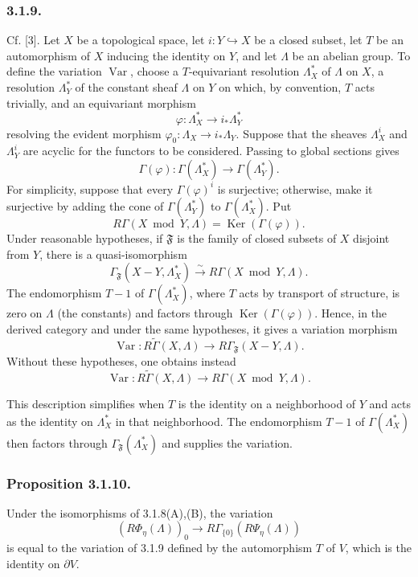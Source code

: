 \subsubsection*{3.1.9.}
Cf. [3].  Let $X$ be a topological space, let
$i:Y\hookrightarrow X$ be a closed subset, let $T$ be an
automorphism of $X$ inducing the identity on $Y$, and let $\Lambda$ be
an abelian group.  To define the variation $\operatorname{Var}$,
choose a $T$-equivariant resolution $\Lambda_X^*$ of $\Lambda$ on
$X$, a resolution $\Lambda_Y^*$ of the constant sheaf $\Lambda$ on
$Y$ on which, by convention, $T$ acts trivially, and an equivariant
morphism
\[
\varphi:\Lambda_X^*\longrightarrow i_*\Lambda_Y^*
\]
resolving the evident morphism
$\varphi_0:\Lambda_X\to i_*\Lambda_Y$.  Suppose that the sheaves
$\Lambda_X^i$ and $\Lambda_Y^i$ are acyclic for the functors to be
considered.  Passing to global sections gives
\[
\Gamma(\varphi):\Gamma(\Lambda_X^*)
\longrightarrow\Gamma(\Lambda_Y^*).
\]
For simplicity, suppose that every $\Gamma(\varphi)^i$ is surjective;
otherwise, make it surjective by adding the cone of
$\Gamma(\Lambda_Y^*)$ to $\Gamma(\Lambda_X^*)$.  Put
\[
R\Gamma(X\bmod Y,\Lambda)=\operatorname{Ker}(\Gamma(\varphi)).
\]
Under reasonable hypotheses, if $\mathfrak F$ is the family of closed
subsets of $X$ disjoint from $Y$, there is a quasi-isomorphism
\[
\Gamma_{\mathfrak F}(X-Y,\Lambda_X^*)
\xrightarrow{\ \sim\ }R\Gamma(X\bmod Y,\Lambda).
\]
The endomorphism $T-1$ of $\Gamma(\Lambda_X^*)$, where $T$ acts by
transport of structure, is zero on $\Lambda$ (the constants) and
factors through $\operatorname{Ker}(\Gamma(\varphi))$.  Hence, in the
derived category and under the same hypotheses, it gives a variation
morphism
\[
\operatorname{Var}:R\widetilde\Gamma(X,\Lambda)
\longrightarrow R\Gamma_{\mathfrak F}(X-Y,\Lambda).
\]
Without these hypotheses, one obtains instead
\[
\operatorname{Var}:R\widetilde\Gamma(X,\Lambda)
\longrightarrow R\Gamma(X\bmod Y,\Lambda).
\]

This description simplifies when $T$ is the identity on a
neighborhood of $Y$ and acts as the identity on $\Lambda_X^*$ in that
neighborhood.  The endomorphism $T-1$ of $\Gamma(\Lambda_X^*)$ then
factors through $\Gamma_{\mathfrak F}(\Lambda_X^*)$ and supplies the
variation.

\subsubsection*{Proposition 3.1.10.}
Under the isomorphisms of 3.1.8(A),(B), the variation
\[
(R\Phi_\eta(\Lambda))_0
\longrightarrow R\Gamma_{\{0\}}(R\Psi_\eta(\Lambda))
\]
is equal to the variation of 3.1.9 defined by the automorphism $T$ of
$V$, which is the identity on $\partial V$.

